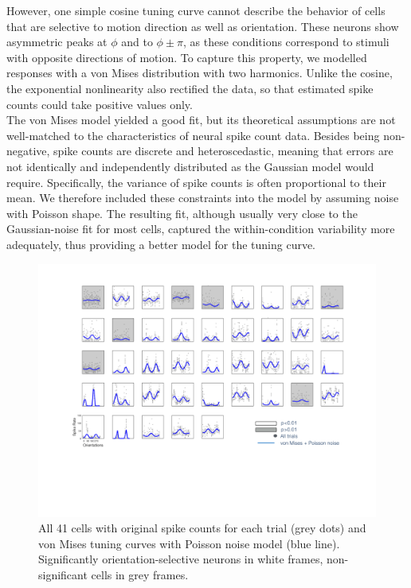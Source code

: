 \documentclass[10pt]{article}
\begin{document}
However, one simple cosine tuning curve cannot describe the behavior of cells that are selective to motion direction as well as orientation. These neurons show asymmetric peaks at $\phi$ and to $\phi \pm \pi$, as these conditions correspond to stimuli with opposite directions of motion. To capture this property, we modelled responses with a von Mises distribution with two harmonics. Unlike the cosine, the exponential nonlinearity also rectified the data, so that estimated spike counts could take positive values only. \\

The von Mises model yielded a good fit, but its theoretical assumptions are not well-matched to the characteristics of neural spike count data. Besides being non-negative, spike counts are discrete and heteroscedastic, meaning that errors are not identically and independently distributed as the Gaussian model would require. Specifically, the variance of spike counts is often proportional to their mean. We therefore included these constraints into the model by assuming noise with Poisson shape. The resulting fit, although usually very close to the Gaussian-noise fit for most cells, captured the within-condition variability more adequately, thus providing a better model for the tuning curve.

\newpage

\begin{figure}[!h]
\centering
\includegraphics[width=1\linewidth]{BIG1.png}
\caption{ All 41 cells with original spike counts for each trial (grey dots) and von Mises tuning curves with Poisson noise model (blue line). Significantly orientation-selective neurons in white frames, non-significant cells in grey frames.
\label{big1}}
\end{figure}


\end{document}
